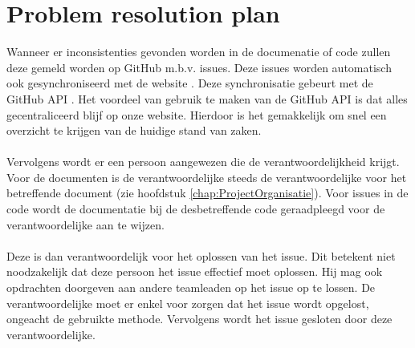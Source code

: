 \section{Problem resolution plan} \label{sec:ProblemResolutionPlan}
Wanneer er inconsistenties gevonden worden in de documenatie of code zullen deze gemeld worden op GitHub m.b.v. issues. Deze issues worden automatisch ook gesynchroniseerd met de website \cite{portalWebsite}. Deze synchronisatie gebeurt met de GitHub API \cite{GitHubAPI}. Het voordeel van gebruik te maken van de GitHub API is dat alles gecentraliceerd blijf op onze website. Hierdoor is het gemakkelijk om snel een overzicht te krijgen van de huidige stand van zaken. 
\\
\\
Vervolgens wordt er een persoon aangewezen die de verantwoordelijkheid krijgt. Voor de documenten is de verantwoordelijke steeds de verantwoordelijke voor het betreffende document (zie hoofdstuk \ref{chap:ProjectOrganisatie}). Voor issues in de code wordt de documentatie bij de desbetreffende code geraadpleegd voor de verantwoordelijke aan te wijzen.
\\
\\
Deze is dan verantwoordelijk voor het oplossen van het issue. Dit betekent niet noodzakelijk dat deze persoon het issue effectief moet oplossen. Hij mag ook opdrachten doorgeven aan andere teamleaden op het issue op te lossen. De verantwoordelijke moet er enkel voor zorgen dat het issue wordt opgelost, ongeacht de gebruikte methode. Vervolgens wordt het issue gesloten door deze verantwoordelijke.

